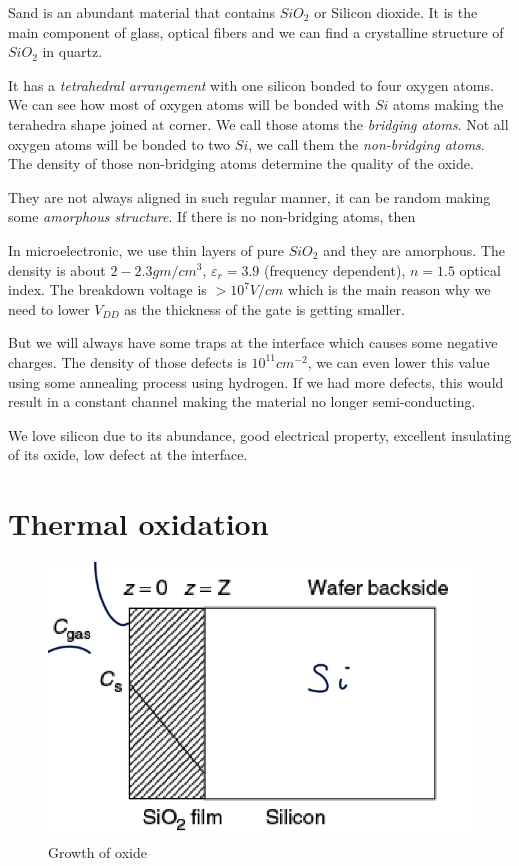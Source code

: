 \documentclass{report}
\begin{document}
Sand is an abundant material that contains $SiO_2$ or Silicon dioxide. It is the main component of glass, optical fibers and we can find a crystalline structure of $SiO_2$ in quartz.

It has a \textit{tetrahedral arrangement} with one silicon bonded to four oxygen atoms. We can see how most of oxygen atoms will be bonded with $Si$ atoms making the terahedra shape joined at corner. We call those atoms the \textit{bridging atoms}. Not all oxygen atoms will be bonded to two $Si$, we call them the \textit{non-bridging atoms}. The density of those non-bridging atoms determine the quality of the oxide.

They are not always aligned in such regular manner, it can be random making some \textit{amorphous structure}. If there is no non-bridging atoms, then

In microelectronic, we use thin layers of pure $SiO_2$ and they are amorphous. The density is about $2-2.3 gm/cm^3$, $\varepsilon_r = 3.9$ (frequency dependent), $n=1.5$ optical index. The breakdown voltage is $> 10^7 V/cm$ which is the main reason why we need to lower $V_{DD}$ as the thickness of the gate is getting smaller.

But we will always have some traps at the interface which causes some negative charges. The density of those defects is $10^{11}cm^{-2}$, we can even lower this value using some annealing process using hydrogen. If we had more defects, this would result in a constant channel making the material no longer semi-conducting.

We love silicon due to its abundance, good electrical property, excellent insulating of its oxide, low defect at the interface.

\newpage

\section{Thermal oxidation}


\begin{figure}
    \centering
    \includegraphics[width=0.95\linewidth]{growth_of_oxide.png}
    \caption{Growth of oxide}
    \label{fig:oxide-growth-label}
\end{figure}
\end{document}
